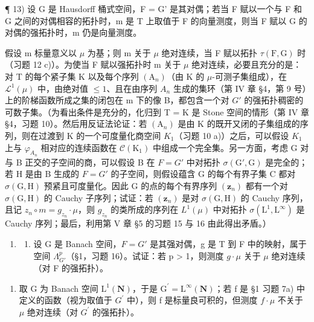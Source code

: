 ¶ 13) 设 G 是 Hausdorff 桶式空间，F = G' 是其对偶；若当 F 赋以一个与 F 和 G 之间的对偶相容的拓扑时，m 是 T 上取值于 F 的向量测度，则当 F 赋以 G 的对偶的强拓扑时，m 仍是向量测度。

假设 m 标量意义以 \(\mu\) 为基；则 m 关于 \(\mu\) 绝对连续，当 F 赋以拓扑 \(\tau(\mathrm{F},\mathrm{G})\) 时（习题 12 c)）。为使当 F 赋以强拓扑时 m 关于 \(\mu\) 绝对连续，必要且充分的是：对 T 的每个紧子集 K 以及每个序列 \((\mathrm{A}_{n})\)（由 K 的 \(\mu\)-可测子集组成），在 \(\mathcal{L}^{1}(\mu)\) 中，由绝对值 \(\leqslant1\)、且在由序列 \(A_{n}\) 生成的集环（第 IV 章 §4，第 9 号）上的阶梯函数所成之集的闭包在 m 下的像 B，都包含一个对 \(G'\) 的强拓扑稠密的可数子集。（为看出条件是充分的，化归到 T = K 是 Stone 空间的情形（第 IV 章 §4，习题 10）。然后用反证法论证：若 \((\mathrm{A}_{n})\) 是由 K 的既开又闭的子集组成的序列，则在过渡到 K 的一个可度量化商空间 \(K_{1}\)（习题 10 a)）之后，可以假设 \(K_{1}\) 上与 \(\varphi_{A_{n}}\) 相对应的连续函数在 \(\mathcal{C}(\mathrm{K}_{1})\) 中组成一个完全集。另一方面，考虑 G 对与 B 正交的子空间的商，可以假设 B 在 \(F = G'\) 中对拓扑 \(\sigma(\mathrm{G}',\mathrm{G})\) 是完全的；若 H 是由 B 生成的 \(F = G'\) 的子空间，则假设蕴含 G 的每个有界子集 C 都对 \(\sigma(\mathrm{G},\mathrm{H})\) 预紧且可度量化。因此 G 的点的每个有界序列 \((\mathbf{z}_{n})\) 都有一个对 \(\sigma(\mathrm{G},\mathrm{H})\) 的 Cauchy 子序列；试证：若 \((\mathbf{z}_{n})\) 是对 \(\sigma(\mathrm{G},\mathrm{H})\) 的 Cauchy 序列，且记 \(z_{n} \circ m = g_{z_{n}} \cdot \mu\)，则 \(g_{z_{n}}\) 的类所成的序列在 \(L^{1}(\mu)\) 中对拓扑 \(\sigma(\mathrm{L}^{1},\mathrm{L}^{\infty})\) 是 Cauchy 序列；最后，利用第 V 章 §5 的习题 15 与 16 由此得出矛盾。）

\begin{enumerate}
\def\labelenumi{\arabic{enumi})}
\setcounter{enumi}{13}
\tightlist
\item
  \begin{enumerate}
  \def\labelenumii{\alph{enumii})}
  \tightlist
  \item
    设 G 是 Banach 空间，\(F = G'\) 是其强对偶，g 是 T 到 F 中的映射，属于空间 \(\Lambda_{G'}^{p}\)（§1，习题 16）。试证：若 p \textgreater{} 1，则测度 \(g \cdot \mu\) 关于 \(\mu\) 绝对连续（对 F 的强拓扑）。
  \end{enumerate}
\end{enumerate}

\begin{enumerate}
\def\labelenumi{\alph{enumi})}
\setcounter{enumi}{1}
\tightlist
\item
  取 G 为 Banach 空间 \(\mathrm{L}^{1}(\mathbf{N})\)，于是 \(\mathrm{G}^{\prime}=\mathrm{L}^{\infty}(\mathbf{N})\)；若 f 是 §1 习题 7a) 中定义的函数（视为取值于 \(G^{\prime}\) 中），则 f 是标量良可积的，但测度 \(f\cdot\mu\) 不关于 \(\mu\) 绝对连续（对 \(G^{\prime}\) 的强拓扑）。
\end{enumerate}

